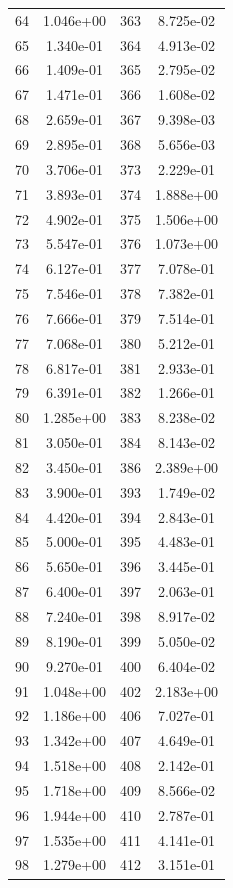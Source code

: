 \documentclass[12pt]{article}
\begin{document}
\begin{longtable}{@{}cccc@{}}
64 & 1.046e+00 & 363 & 8.725e-02 \\
65 & 1.340e-01 & 364 & 4.913e-02 \\
66 & 1.409e-01 & 365 & 2.795e-02 \\
67 & 1.471e-01 & 366 & 1.608e-02 \\
68 & 2.659e-01 & 367 & 9.398e-03 \\
69 & 2.895e-01 & 368 & 5.656e-03 \\
70 & 3.706e-01 & 373 & 2.229e-01 \\
71 & 3.893e-01 & 374 & 1.888e+00 \\
72 & 4.902e-01 & 375 & 1.506e+00 \\
73 & 5.547e-01 & 376 & 1.073e+00 \\
74 & 6.127e-01 & 377 & 7.078e-01 \\
75 & 7.546e-01 & 378 & 7.382e-01 \\
76 & 7.666e-01 & 379 & 7.514e-01 \\
77 & 7.068e-01 & 380 & 5.212e-01 \\
78 & 6.817e-01 & 381 & 2.933e-01 \\
79 & 6.391e-01 & 382 & 1.266e-01 \\
80 & 1.285e+00 & 383 & 8.238e-02 \\
81 & 3.050e-01 & 384 & 8.143e-02 \\
82 & 3.450e-01 & 386 & 2.389e+00 \\
83 & 3.900e-01 & 393 & 1.749e-02 \\
84 & 4.420e-01 & 394 & 2.843e-01 \\
85 & 5.000e-01 & 395 & 4.483e-01 \\
86 & 5.650e-01 & 396 & 3.445e-01 \\
87 & 6.400e-01 & 397 & 2.063e-01 \\
88 & 7.240e-01 & 398 & 8.917e-02 \\
89 & 8.190e-01 & 399 & 5.050e-02 \\
90 & 9.270e-01 & 400 & 6.404e-02 \\
91 & 1.048e+00 & 402 & 2.183e+00 \\
92 & 1.186e+00 & 406 & 7.027e-01 \\
93 & 1.342e+00 & 407 & 4.649e-01 \\
94 & 1.518e+00 & 408 & 2.142e-01 \\
95 & 1.718e+00 & 409 & 8.566e-02 \\
96 & 1.944e+00 & 410 & 2.787e-01 \\
97 & 1.535e+00 & 411 & 4.141e-01 \\
98 & 1.279e+00 & 412 & 3.151e-01 \\

\end{longtable}
\end{document}
